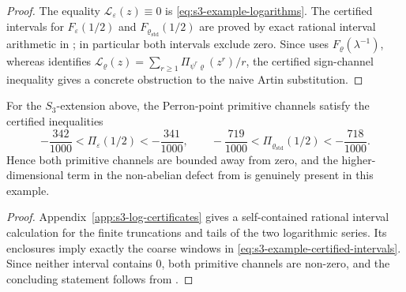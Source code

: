 \begin{proof}
  The equality \(\mathcal L_\varepsilon(z)\equiv0\) is
  \eqref{eq:s3-example-logarithms}. The certified intervals for
  \(F_\varepsilon(1/2)\) and \(F_{\varrho_{\mathrm{std}}}(1/2)\) are proved by exact rational
  interval arithmetic in ; in
  particular both intervals exclude zero. Since
   uses
  \(F_\varrho(\lambda^{-1})\), whereas
   identifies
  \(\mathcal L_\varrho(z)=\sum_{r\ge1}\Pi_{\psi^r\varrho}(z^r)/r\), the
  certified sign-channel inequality gives a concrete obstruction to the
  naive Artin substitution.
\end{proof}

\begin{lemma}
  \label{lem:s3-example-perron-certificates}
  For the \(S_3\)-extension above, the Perron-point primitive channels
  satisfy the certified inequalities
  \begin{equation}\label{eq:s3-example-certified-intervals}
    -\frac{342}{1000}
    <\Pi_\varepsilon(1/2)<-\frac{341}{1000},
    \qquad
    -\frac{719}{1000}
    <\Pi_{\varrho_{\mathrm{std}}}(1/2)<-\frac{718}{1000}.
  \end{equation}
  Hence both primitive channels are bounded away from zero, and the
  higher-dimensional term in the non-abelian defect from
   is genuinely present in this
  example.
\end{lemma}

\begin{proof}
  Appendix~\ref{app:s3-log-certificates} gives a self-contained
  rational interval calculation for the finite truncations and tails of
  the two logarithmic series. Its enclosures imply exactly the coarse
  windows in \eqref{eq:s3-example-certified-intervals}. Since neither
  interval contains \(0\), both primitive channels are non-zero, and the
  concluding statement follows from
  .
\end{proof}

